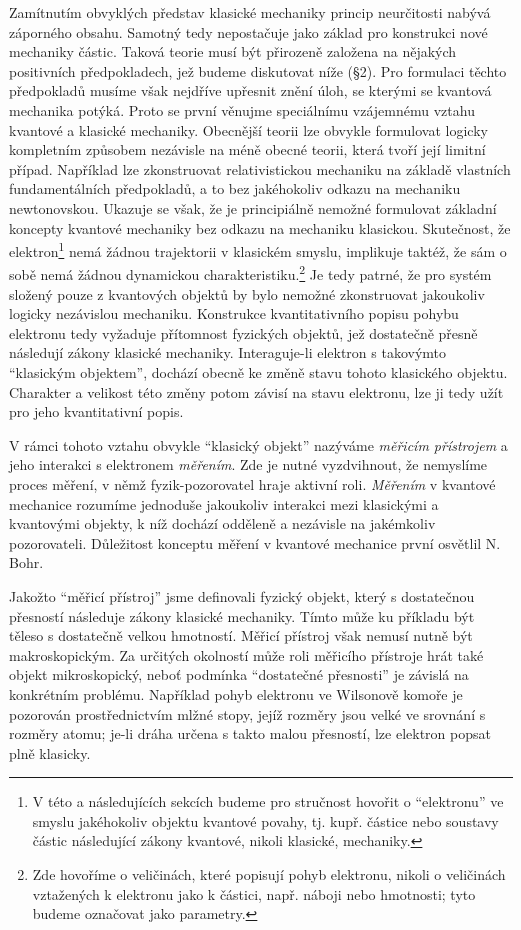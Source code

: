 Zamítnutím obvyklých představ klasické mechaniky princip neurčitosti nabývá záporného obsahu. Samotný tedy nepostačuje jako základ pro konstrukci nové mechaniky částic. Taková teorie musí být přirozeně založena na nějakých positivních předpokladech, jež budeme diskutovat níže (§2). Pro formulaci těchto předpokladů musíme však nejdříve upřesnit znění úloh, se kterými se kvantová mechanika potýká. Proto se první věnujme speciálnímu vzájemnému vztahu kvantové a klasické mechaniky. Obecnější teorii lze obvykle formulovat logicky kompletním způsobem nezávisle na méně obecné teorii, která tvoří její limitní případ. Například lze zkonstruovat relativistickou mechaniku na základě vlastních fundamentálních předpokladů, a to bez jakéhokoliv odkazu na mechaniku newtonovskou. Ukazuje se však, že je principiálně nemožné formulovat základní koncepty kvantové mechaniky bez odkazu na mechaniku klasickou. Skutečnost, že elektron\footnote{V této a následujících sekcích budeme pro stručnost hovořit o ``elektronu'' ve smyslu jakéhokoliv objektu kvantové povahy, tj. kupř. částice nebo soustavy částic následující zákony kvantové, nikoli klasické, mechaniky.} nemá žádnou trajektorii v klasickém smyslu, implikuje taktéž, že sám o sobě nemá žádnou dynamickou charakteristiku.\footnote{Zde hovoříme o veličinách, které popisují pohyb elektronu, nikoli o veličinách vztažených k elektronu jako k částici, např. náboji nebo hmotnosti; tyto budeme označovat jako parametry.} Je tedy patrné, že pro systém složený pouze z kvantových objektů by bylo nemožné zkonstruovat jakoukoliv logicky nezávislou mechaniku. Konstrukce kvantitativního popisu pohybu elektronu tedy vyžaduje přítomnost fyzických objektů, jež dostatečně přesně následují zákony klasické mechaniky. Interaguje-li elektron s takovýmto ``klasickým objektem'', dochází obecně ke změně stavu tohoto klasického objektu. Charakter a velikost této změny potom závisí na stavu elektronu, lze ji tedy užít pro jeho kvantitativní popis.\par
V rámci tohoto vztahu obvykle ``klasický objekt'' nazýváme \emph{měřicím přístrojem} a jeho interakci s elektronem \emph{měřením}. Zde je nutné vyzdvihnout, že nemyslíme proces měření, v němž fyzik-pozorovatel hraje aktivní roli. \emph{Měřením} v kvantové mechanice rozumíme jednoduše jakoukoliv interakci mezi klasickými a kvantovými objekty, k níž dochází odděleně a nezávisle na jakémkoliv pozorovateli. Důležitost konceptu měření v kvantové mechanice první osvětlil N. Bohr.\par
Jakožto ``měřicí přístroj'' jsme definovali fyzický objekt, který s dostatečnou přesností následuje zákony klasické mechaniky. Tímto může ku příkladu být těleso s dostatečně velkou hmotností. Měřicí přístroj však nemusí nutně být makroskopickým. Za určitých okolností může roli měřicího přístroje hrát také objekt mikroskopický, neboť podmínka ``dostatečné přesnosti'' je závislá na konkrétním problému. Například pohyb elektronu ve Wilsonově komoře je pozorován prostřednictvím mlžné stopy, jejíž rozměry jsou velké ve srovnání s rozměry atomu; je-li dráha určena s takto malou přesností, lze elektron popsat plně klasicky.\par
